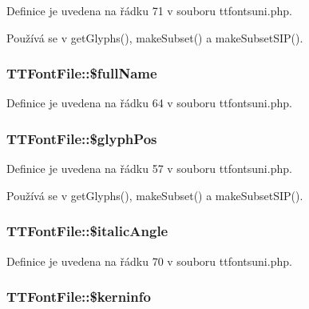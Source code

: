 Definice je uvedena na řádku 71 v souboru ttfontsuni.\-php.



Používá se v get\-Glyphs(), make\-Subset() a make\-Subset\-S\-I\-P().

\hypertarget{class_t_t_font_file_a077c70997ac180d3e509a24637318e4b}{
\subsubsection[{\$full\-Name}]{\setlength{\rightskip}{0pt plus 5cm}T\-T\-Font\-File\-::\$full\-Name}}\label{class_t_t_font_file_a077c70997ac180d3e509a24637318e4b}


Definice je uvedena na řádku 64 v souboru ttfontsuni.\-php.

\hypertarget{class_t_t_font_file_a127c52d52be666c2f3c8f8a2565dfb59}{
\subsubsection[{\$glyph\-Pos}]{\setlength{\rightskip}{0pt plus 5cm}T\-T\-Font\-File\-::\$glyph\-Pos}}\label{class_t_t_font_file_a127c52d52be666c2f3c8f8a2565dfb59}


Definice je uvedena na řádku 57 v souboru ttfontsuni.\-php.



Používá se v get\-Glyphs(), make\-Subset() a make\-Subset\-S\-I\-P().

\hypertarget{class_t_t_font_file_a982c7559e516926a8735d8c2dc01976b}{
\subsubsection[{\$italic\-Angle}]{\setlength{\rightskip}{0pt plus 5cm}T\-T\-Font\-File\-::\$italic\-Angle}}\label{class_t_t_font_file_a982c7559e516926a8735d8c2dc01976b}


Definice je uvedena na řádku 70 v souboru ttfontsuni.\-php.

\hypertarget{class_t_t_font_file_a30a9633378ea640cee5ddcd3ebff5cb4}{
\subsubsection[{\$kerninfo}]{\setlength{\rightskip}{0pt plus 5cm}T\-T\-Font\-File\-::\$kerninfo}}\label{class_t_t_font_file_a30a9633378ea640cee5ddcd3ebff5cb4}


